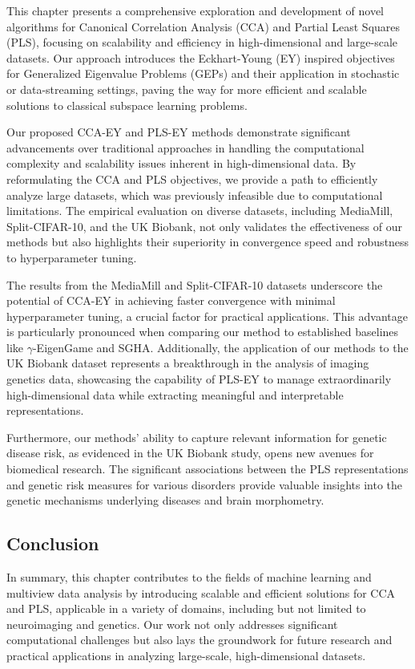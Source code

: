 This chapter presents a comprehensive exploration and development of novel algorithms for Canonical Correlation Analysis (CCA) and Partial Least Squares (PLS), focusing on scalability and efficiency in high-dimensional and large-scale datasets.
Our approach introduces the Eckhart-Young (EY) inspired objectives for Generalized Eigenvalue Problems (GEPs) and their application in stochastic or data-streaming settings, paving the way for more efficient and scalable solutions to classical subspace learning problems.

Our proposed CCA-EY and PLS-EY methods demonstrate significant advancements over traditional approaches in handling the computational complexity and scalability issues inherent in high-dimensional data.
By reformulating the CCA and PLS objectives, we provide a path to efficiently analyze large datasets, which was previously infeasible due to computational limitations.
The empirical evaluation on diverse datasets, including MediaMill, Split-CIFAR-10, and the UK Biobank, not only validates the effectiveness of our methods but also highlights their superiority in convergence speed and robustness to hyperparameter tuning.

The results from the MediaMill and Split-CIFAR-10 datasets underscore the potential of CCA-EY in achieving faster convergence with minimal hyperparameter tuning, a crucial factor for practical applications.
This advantage is particularly pronounced when comparing our method to established baselines like $\gamma$-EigenGame and SGHA. Additionally, the application of our methods to the UK Biobank dataset represents a breakthrough in the analysis of imaging genetics data, showcasing the capability of PLS-EY to manage extraordinarily high-dimensional data while extracting meaningful and interpretable representations.

Furthermore, our methods' ability to capture relevant information for genetic disease risk, as evidenced in the UK Biobank study, opens new avenues for biomedical research.
The significant associations between the PLS representations and genetic risk measures for various disorders provide valuable insights into the genetic mechanisms underlying diseases and brain morphometry.

\subsection{Conclusion}

In summary, this chapter contributes to the fields of machine learning and multiview data analysis by introducing scalable and efficient solutions for CCA and PLS, applicable in a variety of domains, including but not limited to neuroimaging and genetics.
Our work not only addresses significant computational challenges but also lays the groundwork for future research and practical applications in analyzing large-scale, high-dimensional datasets.